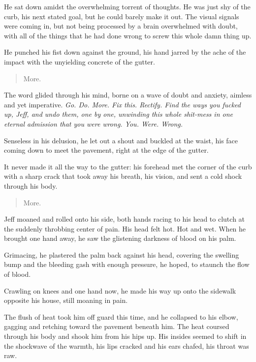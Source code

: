 He sat down amidst the overwhelming torrent of thoughts.  He was just shy of the curb, his next stated goal, but he could barely make it out.  The visual signals were coming in, but not being processed by a brain overwhelmed with doubt, with all of the things that he had done wrong to screw this whole damn thing up.

He punched his fist down against the ground, his hand jarred by the ache of the impact with the unyielding concrete of the gutter.

\begin{quote}
  More.
\end{quote}

The word glided through his mind, borne on a wave of doubt and anxiety, aimless and yet imperative.  \textit{Go.  Do.  More.  Fix this.  Rectify.  Find the ways you fucked up, Jeff, and undo them, one by one, unwinding this whole shit-mess in one eternal admission that you were wrong.  You.  Were.  Wrong.}

Senseless in his delusion, he let out a shout and buckled at the waist, his face coming down to meet the pavement, right at the edge of the gutter.

It never made it all the way to the gutter: his forehead met the corner of the curb with a sharp crack that took away his breath, his vision, and sent a cold shock through his body.

\begin{quote}
  More.
\end{quote}

Jeff moaned and rolled onto his side, both hands racing to his head to clutch at the suddenly throbbing center of pain.  His head felt hot.  Hot and wet.  When he brought one hand away, he saw the glistening darkness of blood on his palm.

Grimacing, he plastered the palm back against his head, covering the swelling bump and the bleeding gash with enough pressure, he hoped, to staunch the flow of blood.

Crawling on knees and one hand now, he made his way up onto the sidewalk opposite his house, still moaning in pain.

The flush of heat took him off guard this time, and he collapsed to his elbow, gagging and retching toward the pavement beneath him.  The heat coursed through his body and shook him from his hips up.  His insides seemed to shift in the shockwave of the warmth, his lips cracked and his ears chafed, his throat was raw.

